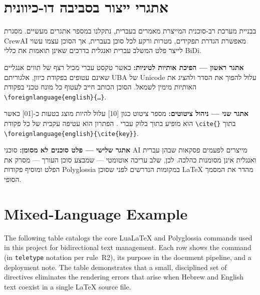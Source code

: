 \section[\texthebrew{אתגרי ייצור בסביבה דו-כיוונית}]{\texthebrew{אתגרי ייצור בסביבה דו-כיוונית}\mbox{\setLTR\enspace\thesection}}
\label{sec:bidi-production}

\begin{hebrew}
בבניית מערכת רב-סוכנית המייצרת מאמרים בעברית,
נתקלנו במספר אתגרים מעשיים.
מסגרת \foreignlanguage{english}{CrewAI}
\foreignlanguage{english}{\cite{CrewAI2024}}
מאפשרת הגדרת תפקידים, מטרות ורקע לכל סוכן בעברית,
אך הסוכן עצמו עשוי לייצר פלט המשלב עברית ואנגלית
בדרכים שאינן תואמות את כללי \foreignlanguage{english}{BiDi}.

\textbf{אתגר ראשון --- הפיכת אותיות לטיניות:}
כאשר טקסט עברי מכיל רצף של תווים אנגליים שאינם עטופים בפקודת כיוון,
אלגוריתם \foreignlanguage{english}{UBA} של \foreignlanguage{english}{Unicode}
עלול להפוך את הסדר ולהציג את האותיות מימין לשמאל.
הסוכן הכותב חייב לעטוף כל מונח טכני
בפקודת \foreignlanguage{english}{\texttt{\textbackslash foreignlanguage\{english\}\{\ldots\}}}.

\textbf{אתגר שני --- ניהול ציטוטים:}
מספר ציטוט כגון \foreignlanguage{english}{[10]}
עלול להיות מוצג בטעות כ-\foreignlanguage{english}{[01]}
כאשר הוא מופיע בתוך בלוק עברי \foreignlanguage{english}{\cite{Unicode2023}}.
הפתרון הוא עטיפה עקבית של כל פקודת
\foreignlanguage{english}{\texttt{\textbackslash cite\{\}}}
בתוך
\foreignlanguage{english}{\texttt{\textbackslash foreignlanguage\{english\}\{\textbackslash cite\{key\}\}}}.

\textbf{אתגר שלישי --- פלט סוכנים לא מסומן:}
סוכני \foreignlanguage{english}{AI}
\foreignlanguage{english}{\cite{Anthropic2024b}}
מייצרים לפעמים פסקאות שבהן עברית ואנגלית אינן מסומנות כהלכה.
לכן, שלב עריכה אוטומטי --- שמבצע סוכן העורך ---
מסרק את הפלט ומוסיף פקודות \foreignlanguage{english}{Polyglossia}
במקומות הנדרשים לפני שסוכן \foreignlanguage{english}{LaTeX}
מהדר את המסמך הסופי.
\end{hebrew}


\section{Mixed-Language Example}
\label{sec:bidi-mixed}

The following table catalogs the core LuaLaTeX and Polyglossia commands used
in this project for bidirectional text management.
Each row shows the command (in \texttt{teletype} notation per rule~R2),
its purpose in the document pipeline, and a deployment note.
The table demonstrates that a small, disciplined set of directives eliminates
the rendering errors that arise when Hebrew and English text coexist in a single
\LaTeX{} source file.

